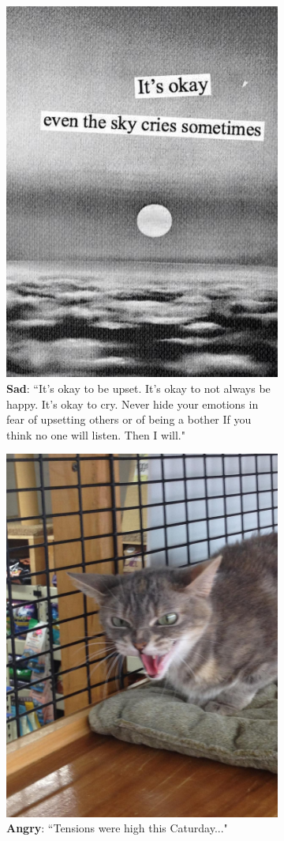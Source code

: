 \begin{figure}
\begin{subfigure}[t]{.5\textwidth}
  \includegraphics[width=.6\linewidth]{Images/sad.jpg}
  \caption{\textbf{Sad}: ``It's okay to be upset. It's okay to not always be happy. It's okay to cry. Never hide your emotions in fear of upsetting others or of being a bother   If you think no one will listen. Then I will."}
\end{subfigure}
\begin{subfigure}[t]{.5\textwidth}
  \vskip 0pt 
  \centering
  \includegraphics[width=.5\linewidth]{Images/angry.jpg}
  \caption{\textbf{Angry}: ``Tensions were high this Caturday..."}
\end{subfigure}
\begin{subfigure}[t]{.5\textwidth}
  \vskip 0pt 
  \centering

\end{subfigure}
\end{figure}
